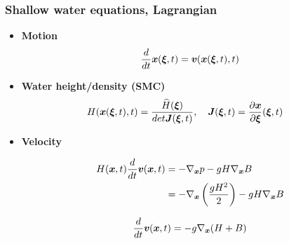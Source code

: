 \documentclass[pt12]{beamer}
\newcommand{\uvec}[2][3]{\boldsymbol{#2\mkern-#1mu}\mkern#1mu}
\begin{document}
\begin{frame}
\frametitle{Shallow water equations, Lagrangian}

\begin{itemize}

\item \textbf{Motion}
$$\frac{d}{dt}\uvec{x}(\uvec{\xi},t)=\uvec{v}(\uvec{x}(\uvec{\xi},t),t)$$

\item \textbf{Water height/density (SMC)} 
\begin{align*}
&H(\uvec{x}(\uvec{\xi},t),t)=\frac{\widehat{H}(\uvec{\xi})}{det \uvec{J}(\uvec{\xi},t)}, \quad \uvec{J}(\uvec{\xi},t)=\frac{\partial \uvec{x}}{\partial \uvec{\xi}}(\uvec{\xi},t)
\end{align*}


\item \textbf{Velocity} 


\begin{align*}
H(\uvec{x},t)\frac{d}{dt}\uvec{v}(\uvec{x},t)&=-\nabla_{\uvec{x}} p  -g H \nabla_{\uvec{x}}B\\
&=-\nabla_{\uvec{x}}\left(\frac{gH^2}{2}\right) -gH\nabla_{\uvec{x}}B
\end{align*}

$$\frac{d}{dt}\uvec{v}(\uvec{x},t)=-g\nabla_{\uvec{x}}(H+B)$$

\end{itemize}


\end{frame}
\end{document}
